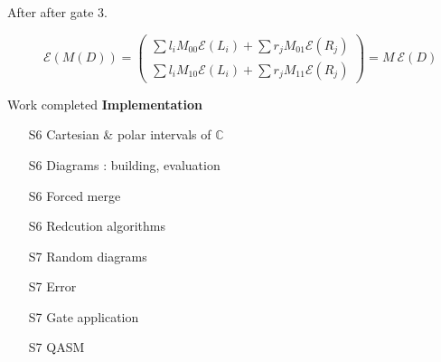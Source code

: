 \begin{frame}{After after gate}
  \Huge \color{cs}3.\color{black}\normalsize
  \begin{figure}[H]
    \centering

    \begingroup
    \renewcommand*{\arraystretch}{1.5}
        $$\mathcal E(M(D)) = \begin{pmatrix}
  \sum l_i M_{00} \mathcal E (L_i) + \sum r_j M_{01} \mathcal E (R_j) \\
  \sum l_i M_{10} \mathcal E (L_i) + \sum r_j M_{11} \mathcal E (R_j)
\end{pmatrix} = M ~ \mathcal E (D)$$
\endgroup
    \end{figure}
\end{frame}

\begin{frame}{Work completed}
  \textbf{Implementation}
  \begin{itemize}
      \item[S6] Cartesian \& polar intervals of $\mathbb C$
      \item[S6] Diagrams : building, evaluation
      \item[S6] Forced merge
      \item[S6] Redcution algorithms
      \item[S7] Random diagrams
      \item[S7] Error
      \item[S7] Gate application
      \item[S7] QASM
  \end{itemize}
\end{frame}
